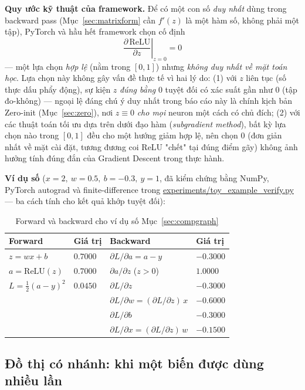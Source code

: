 \documentclass[12pt,a4paper]{article}
\newcommand{\en}[1]{\textit{#1}}
\begin{document}
\textbf{Quy ước kỹ thuật của framework.} Để có một con số \emph{duy nhất}
dùng trong backward pass (Mục~\ref{sec:matrixform} cần $f'(z)$ là một hàm
số, không phải một tập), PyTorch và hầu hết framework chọn cố định
$$\left.\frac{\partial\,\mathrm{ReLU}}{\partial z}\right\vert_{z=0} = 0$$
--- một lựa chọn \emph{hợp lệ} (nằm trong $[0,1]$) nhưng \emph{không duy
nhất về mặt toán học}. Lựa chọn này không gây vấn đề thực tế vì hai lý do:
(1) với $z$ liên tục (số thực dấu phẩy động), sự kiện $z$ \emph{đúng bằng}
$0$ tuyệt đối có xác suất gần như $0$ (tập đo-không) --- ngoại lệ đáng chú
ý duy nhất trong báo cáo này là chính kịch bản Zero-init
(Mục~\ref{sec:zero}), nơi $z\equiv0$ \emph{cho mọi} neuron một cách có chủ
đích; (2) với các thuật toán tối ưu dựa trên dưới đạo hàm
(\en{subgradient method}), bất kỳ lựa chọn nào trong $[0,1]$ đều cho một
hướng giảm hợp lệ, nên chọn $0$ (đơn giản nhất về mặt cài đặt, tương
đương coi ReLU "chết" tại đúng điểm gãy) không ảnh hưởng tính đúng đắn
của Gradient Descent trong thực hành.

\textbf{Ví dụ số} ($x=2,\ w=0.5,\ b=-0.3,\ y=1$, đã kiểm chứng bằng
NumPy, PyTorch autograd và finite-difference trong
\url{experiments/toy_example_verify.py} --- ba cách tính cho kết quả
khớp tuyệt đối):

\begin{table}[H]
\centering
\caption{Forward và backward cho ví dụ số Mục~\ref{sec:compgraph}}
\begin{tabular}{@{}llll@{}}
\toprule
\textbf{Forward} & \textbf{Giá trị} & \textbf{Backward} & \textbf{Giá trị} \\
\midrule
$z=wx+b$ & $0.7000$ & $\partial L/\partial a = a-y$ & $-0.3000$ \\
$a=\mathrm{ReLU}(z)$ & $0.7000$ & $\partial a/\partial z$ ($z>0$) & $1.0000$ \\
$L=\tfrac12(a-y)^2$ & $0.0450$ & $\partial L/\partial z$ & $-0.3000$ \\
 & & $\partial L/\partial w = (\partial L/\partial z)\,x$ & $-0.6000$ \\
 & & $\partial L/\partial b$ & $-0.3000$ \\
 & & $\partial L/\partial x = (\partial L/\partial z)\,w$ & $-0.1500$ \\
\bottomrule
\end{tabular}
\label{tab:compgraph_numeric}
\end{table}

\subsection{Đồ thị có nhánh: khi một biến được dùng nhiều lần}
\label{sec:branching}
\end{document}
